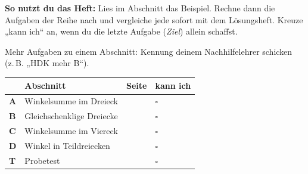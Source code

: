 \documentclass[11pt]{article}
\begin{document}
\par\smallskip
{}\par\medskip
\noindent\textbf{So nutzt du das Heft:} Lies im Abschnitt das Beispiel. Rechne dann die Aufgaben der Reihe nach und vergleiche jede sofort mit dem Lösungsheft. Kreuze „kann ich“ an, wenn du die letzte Aufgabe (\emph{Ziel}) allein schaffst.\par
\noindent Mehr Aufgaben zu einem Abschnitt: Kennung deinem Nachhilfelehrer schicken (z.\,B. „HDK mehr B“).\par\medskip
{\renewcommand{\arraystretch}{1.3}
\noindent\begin{tabular}{|>{\bfseries}p{10mm}|p{112mm}|>{\raggedleft\arraybackslash}p{10mm}|>{\centering\arraybackslash}p{14mm}|}\hline
\rowcolor{black!8} & \textbf{Abschnitt} & \textbf{Seite} & \textbf{kann ich}\\\hline
A & Winkelsumme im Dreieck & \pageref{s:A} & $\square$\\\hline
B & Gleichschenklige Dreiecke & \pageref{s:B} & $\square$\\\hline
C & Winkelsumme im Viereck & \pageref{s:C} & $\square$\\\hline
D & Winkel in Teildreiecken & \pageref{s:D} & $\square$\\\hline
T & Probetest & \pageref{s:T} & $\square$\\\hline
\end{tabular}}\par\bigskip
\end{document}
